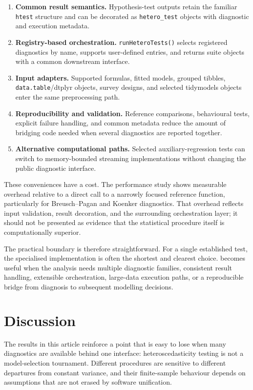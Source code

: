 \begin{enumerate}
\def\labelenumi{\arabic{enumi}.}
\tightlist
\item
  \textbf{Common result semantics.} Hypothesis-test outputs retain the familiar
  \texttt{htest} structure and can be decorated as \texttt{hetero\_test} objects with
  diagnostic and execution metadata.
\item
  \textbf{Registry-based orchestration.} \texttt{runHeteroTests()} selects registered
  diagnostics by name, supports user-defined entries, and returns suite objects
  with a common downstream interface.
\item
  \textbf{Input adapters.} Supported formulas, fitted models, grouped tibbles,
  \texttt{data.table}/dtplyr objects, survey designs, and selected tidymodels objects
  enter the same preprocessing path.
\item
  \textbf{Reproducibility and validation.} Reference comparisons, behavioural tests,
  explicit failure handling, and common metadata reduce the amount of bridging
  code needed when several diagnostics are reported together.
\item
  \textbf{Alternative computational paths.} Selected auxiliary-regression tests can
  switch to memory-bounded streaming implementations without changing the
  public diagnostic interface.
\end{enumerate}

These conveniences have a cost. The performance study shows measurable
overhead relative to a direct call to a narrowly focused reference function,
particularly for Breusch--Pagan and Koenker diagnostics. That overhead reflects
input validation, result decoration, and the surrounding orchestration layer;
it should not be presented as evidence that the statistical procedure itself
is computationally superior.

The practical boundary is therefore straightforward. For a single established
test, the specialised implementation is often the shortest and clearest
choice.  becomes useful when the analysis needs multiple
diagnostic families, consistent result handling, extensible orchestration,
large-data execution paths, or a reproducible bridge from diagnosis to
subsequent modelling decisions.

\section{Discussion}\label{discussion}

The results in this article reinforce a point that is easy to lose when many
diagnostics are available behind one interface: heteroscedasticity testing is
not a model-selection tournament. Different procedures are sensitive to
different departures from constant variance, and their finite-sample behaviour
depends on assumptions that are not erased by software unification.

